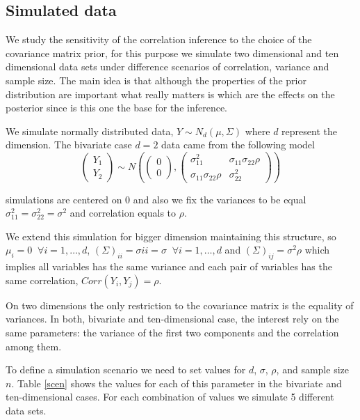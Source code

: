 \documentclass{article}
\begin{document}
\subsection{Simulated data} 

We study the sensitivity of the correlation inference to the choice of the covariance matrix prior, for this purpose we simulate two dimensional and ten dimensional data sets under difference scenarios of correlation, variance and sample size. The main idea is that although the properties of the prior distribution are important what really matters is which are the effects on the posterior since is this one the base for the inference. 

We simulate normally distributed data, $Y \sim N_d(\mu, \Sigma) $ where $d$ represent the dimension. The bivariate case $d=2$ data came from the following model 
\begin{equation}
\begin{pmatrix}  Y_1 \\ Y_2 \end{pmatrix} \sim 
N\left( \begin{pmatrix}  0 \\ 0 \end{pmatrix}, \begin{pmatrix}  \sigma_{11}^2 & \sigma_{11}\sigma_{22}\rho \\ \sigma_{11}\sigma_{22}\rho & \sigma_{22}^2 \end{pmatrix} \right)
\label{modsim}
\end{equation} 

simulations are centered on 0 and also we fix the variances to be equal $\sigma_{11}^2=\sigma_{22}^2=\sigma^2$ and correlation equals to $\rho$. 

We extend this simulation for bigger dimension maintaining this structure, so $\mu_i = 0 \;\; \forall i=1,\ldots,d$, $(\Sigma)_{ii} = \sigma{ii}=\sigma \;\; \forall i=1,\ldots,d$ and $(\Sigma)_{ij} = \sigma^2\rho$ which implies all variables has the same variance and each pair of variables has the same correlation, $Corr(Y_{i}, Y_{j}) = \rho$. 

On two dimensions the only restriction to the covariance matrix is the equality of variances. In both, bivariate and ten-dimensional case, the interest rely on the same parameters: the variance of the first two components and the correlation among them. 

To define a simulation scenario we need to set values for $d$, $\sigma$, $\rho$, and sample size $n$. Table \ref{scen} shows the values for each of this parameter in the bivariate and ten-dimensional cases. For each combination of values we simulate 5 different data sets.  
\end{document}
